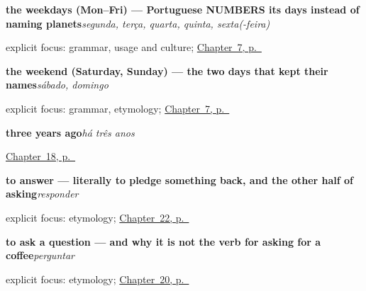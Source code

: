\noindent\begin{minipage}[t]{\linewidth}
\raggedright
\textbf{the weekdays (Mon–Fri) — Portuguese NUMBERS its days instead of naming planets}\enspace\emph{segunda, terça, quarta, quinta, sexta(-feira)}\par
\footnotesize explicit focus: grammar, usage and culture; \hyperref[ch:pt-days-of-the-week]{Chapter~7, p.~\pageref*{ch:pt-days-of-the-week}}
\end{minipage}\par\smallskip

\noindent\begin{minipage}[t]{\linewidth}
\raggedright
\textbf{the weekend (Saturday, Sunday) — the two days that kept their names}\enspace\emph{sábado, domingo}\par
\footnotesize explicit focus: grammar, etymology; \hyperref[ch:pt-days-of-the-week]{Chapter~7, p.~\pageref*{ch:pt-days-of-the-week}}
\end{minipage}\par\smallskip

\noindent\begin{minipage}[t]{\linewidth}
\raggedright
\textbf{three years ago}\enspace\emph{há três anos}\par
\footnotesize \hyperref[ch:pt-core-verbs]{Chapter~18, p.~\pageref*{ch:pt-core-verbs}}
\end{minipage}\par\smallskip

\noindent\begin{minipage}[t]{\linewidth}
\raggedright
\textbf{to answer — literally to pledge something back, and the other half of asking}\enspace\emph{responder}\par
\footnotesize explicit focus: etymology; \hyperref[ch:pt-answering-meeting-playing]{Chapter~22, p.~\pageref*{ch:pt-answering-meeting-playing}}
\end{minipage}\par\smallskip

\noindent\begin{minipage}[t]{\linewidth}
\raggedright
\textbf{to ask a question — and why it is not the verb for asking for a coffee}\enspace\emph{perguntar}\par
\footnotesize explicit focus: etymology; \hyperref[ch:pt-taking-asking-helping-liking]{Chapter~20, p.~\pageref*{ch:pt-taking-asking-helping-liking}}
\end{minipage}\par\smallskip

